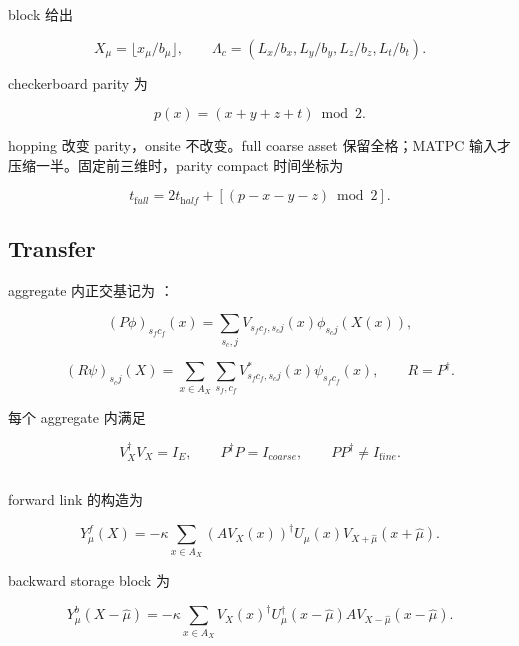 \documentclass[UTF8,a4paper,10pt]{ctexart}
\DeclareRobustCommand{\pycode}[1]{\texorpdfstring{\texttt{\seqsplit{#1}}}{#1}}
\begin{document}
block \pycode{b=(b\_x,b\_y,b\_z,b\_t)} 给出

\begin{displaymath}
X_\mu=\lfloor x_\mu/b_\mu\rfloor, \qquad \Lambda_c=(L_x/b_x,L_y/b_y,L_z/b_z,L_t/b_t).
\end{displaymath}

checkerboard parity 为

\begin{displaymath}
p(x)=(x+y+z+t)\bmod2.
\end{displaymath}

hopping 改变 parity，onsite 不改变。full coarse asset 保留全格；MATPC 输入才压缩一半。固定前三维时，parity compact 时间坐标为

\begin{displaymath}
t_{\mathrm full}=2t_{\mathrm half}+[(p-x-y-z)\bmod2].
\end{displaymath}

\subsection{Transfer}
aggregate 内正交基记为 \pycode{V}：

\begin{displaymath}
(P\phi)_{s_fc_f}(x)= \sum_{s_c,j}V_{s_fc_f,s_cj}(x)\phi_{s_cj}(X(x)),
\end{displaymath}

\begin{displaymath}
(R\psi)_{s_cj}(X)= \sum_{x\in A_X}\sum_{s_f,c_f} V_{s_fc_f,s_cj}^*(x)\psi_{s_fc_f}(x), \qquad R=P^\dagger.
\end{displaymath}

每个 aggregate 内满足

\begin{displaymath}
V_X^\dagger V_X=I_E, \qquad P^\dagger P=I_{\mathrm coarse}, \qquad PP^\dagger\ne I_{\mathrm fine}.
\end{displaymath}

\subsection{\pycode{X/Y}}
forward link 的构造为

\begin{displaymath}
Y_\mu^{f}(X) =-\kappa\sum_{x\in A_X} (A V_X(x))^\dagger U_\mu(x)V_{X+\hat\mu}(x+\hat\mu).
\end{displaymath}

backward storage block 为

\begin{displaymath}
Y_\mu^{b}(X-\hat\mu) =-\kappa\sum_{x\in A_X} V_X(x)^\dagger U_\mu^\dagger(x-\hat\mu) A V_{X-\hat\mu}(x-\hat\mu).
\end{displaymath}
\end{document}
